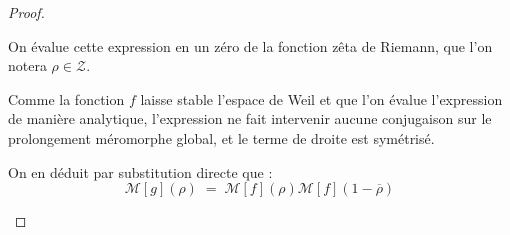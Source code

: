 \documentclass[Riemann_Hypothesis.tex]{subfiles}
\begin{document}
\begin{proof}
\begin{part_proof}
\begin{equation*}
        \end{equation*}
        On évalue cette expression en un zéro de la fonction zêta de Riemann, que l'on notera $\rho \in \mathcal{Z}$. \par
        Comme la fonction $f$ laisse stable l'espace de Weil et que l'on évalue l'expression de manière analytique, l'expression ne fait intervenir aucune conjugaison sur le prolongement méromorphe global, et le terme de droite est symétrisé. \par
        On en déduit par substitution directe que :
        \begin{equation*}
            \mathcal{M}[g](\rho) \;=\; \mathcal{M}[f](\rho) \mathcal{M}[f](1-\overline{\rho})
        \end{equation*}
    \end{part_proof}


\end{proof}
\end{document}

